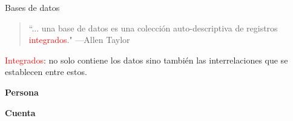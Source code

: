 \begin{frame}{Bases de datos}
    \begin{overlayarea}{\linewidth}{\textheight}
        \begin{onlyenv}
            \begin{block}{}
                \begin{quote}
                    ``... una base de datos es una colecci\'on auto-descriptiva de registros \textcolor{red}{integrados}."
                    \hspace{1em plus 1fill}---Allen Taylor
                \end{quote}
                \textcolor{red}{Integrados}: no solo contiene los datos sino tambi\'en las interrelaciones
                 que se establecen entre estos.
            \end{block}
      \end{onlyenv}

      \vspace{5mm}
    \large \textbf{Persona}
    \vspace{2mm}

    \vspace{5mm}


    \large \textbf{Cuenta}

    \vspace{2mm}
    \end{overlayarea}
    

    
\end{frame}




